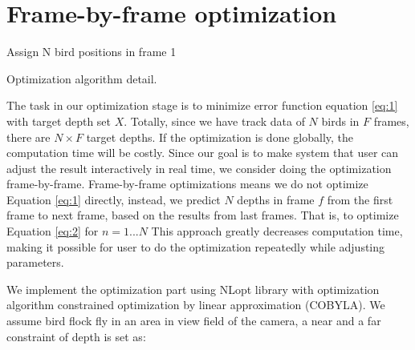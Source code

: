\section{Frame-by-frame optimization}

\begin{algorithm}%
\SetAlgoLined
{}
Assign N bird positions in frame 1 \;

\caption{Optimization algorithm detail.}
\label{algo:optimization}
\end{algorithm}



The task in our optimization stage is to minimize error function equation \ref{eq:1} with target depth set $X$. Totally, since we have track data of $N$ birds in $F$ frames, there are $N{\times}F$ target depths. If the optimization is done globally, the computation time will be costly. Since our goal is to make system that user can adjust the result interactively in real time, we consider doing the optimization frame-by-frame. Frame-by-frame optimizations means we do not optimize Equation \ref{eq:1} directly, instead, we predict $N$ depths in frame $f$ from the first frame to next frame, based on the results from last frames. That is, to optimize Equation \ref{eq:2} for $n=1...N$ This approach greatly decreases computation time, making it possible for user to do the optimization repeatedly while adjusting parameters.


We implement the optimization part using NLopt library \cite{NLopt} with optimization algorithm constrained optimization by linear approximation (COBYLA)\cite{COBYLA}. We assume bird flock fly in an area in view field of the camera, a near and a far constraint of depth is set as:


